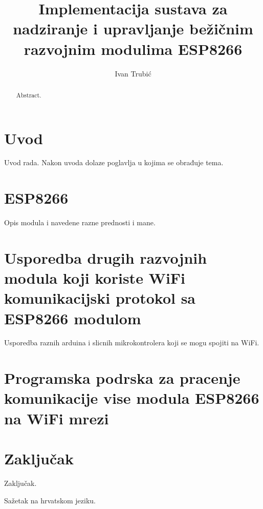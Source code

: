 \documentclass[times, utf8, zavrsni]{fer}
\begin{document}

\title{Implementacija sustava za nadziranje i upravljanje bežičnim razvojnim modulima ESP8266}

\author{Ivan Trubić}

\maketitle

\izvornik

\zahvala{}

\tableofcontents

\chapter{Uvod}
Uvod rada. Nakon uvoda dolaze poglavlja u kojima se obrađuje tema.

\chapter{ESP8266}
Opis modula i navedene razne prednosti i mane.

\chapter{Usporedba drugih razvojnih modula koji koriste WiFi komunikacijski protokol sa ESP8266 modulom}
Usporedba raznih arduina i slicnih mikrokontrolera koji se mogu spojiti na WiFi.

\chapter{Programska podrska za pracenje komunikacije vise modula ESP8266 na WiFi mrezi}

\chapter{Zaključak}
Zaključak.




\begin{sazetak}
Sažetak na hrvatskom jeziku.

\end{sazetak}

\begin{abstract}
Abstract.

\end{abstract}
\end{document}
